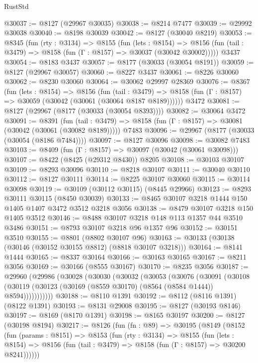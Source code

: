 \begin{lexlean}{RustStd}
\begin{coremodule}
@30037 := @8127 (@29967 @30035)
@30038 := @8214 @7477
@30039 := @29992 @30038
@30040 := @8198 @30039
@30042 := @8127 (@30040 @8219)
@30053 := @8345
    (fun (rty : @3134) =>
    @8155
      (fun (lets : @8154) =>
      @8156 (fun (tail : @3479) => @8158 (fun (Γ : @8157) => @30037 (@30042 @30002)))))
    @3437
@30054 := @8183 @3437
@30057 := @8177 (@30033 (@30054 @8191))
@30059 := @8127 (@29967 @30057)
@30060 := @8227 @3437
@30061 := @8226 @30060
@30062 := @8230 @30060
@30064 := @30062 @29997 @28369
@30076 := @8367
    (fun (lets : @8154) =>
    @8156
      (fun (tail : @3479) =>
      @8158 (fun (Γ : @8157) => @30059 (@30042 (@30061 (@30064 @8187 @8189))))))
    @3472
@30081 := @8127 (@29967 (@8177 (@30033 (@30054 @8393))))
@30082 := @30064 @3472
@30091 := @8391
    (fun (tail : @3479) => @8158 (fun (Γ : @8157) => @30081 (@30042 (@30061 (@30082 @8189)))))
    @7483
@30096 := @29967 (@8177 (@30033 (@30054 (@8186 @7484))))
@30097 := @8127 @30096
@30098 := @30082 @7483
@30103 := @8409 (fun (Γ : @8157) => @30097 (@30042 (@30061 @30098)))
@30107 := @8422 (@8425 (@29312 @8430)) @8205
@30108 := @30103 @30107
@30109 := @8293 @30096
@30110 := @8218 @30107
@30111 := @30040 @30110
@30112 := @8127 @30111
@30114 := @8225 @30107 @30060
@30115 := @30114 @30098
@30119 := @30109 (@30112 @30115) (@8445 @29966)
@30123 := @8293 @30111 @30115 (@8450 @30039)
@30133 := @8465 @30107 @3218 @1444 @150 @1405 @1407 @3472 @3512 @3218 @3056
@30138 := @8479 @30107 @3218 @150 @1405 @3512
@30146 := @8488 @30107 @3218 @148 @113 @1357 @44 @3510 @3486
@30151 := @8793 @30107 @3218 @96 @1357 @96
@30152 := @30151 @3510
@30155 := @8801 (@8802 @30107 @96)
@30163 := @30133 (@30138 (@30146 (@30152 @30155 @8812) (@8818 @30107 @3218)))
@30164 := @8141 @1444
@30165 := @8337 @30164
@30166 := @30163 @30165
@30167 := @8211 @3056
@30169 := @30166 (@8555 @30167)
@30170 := @8235 @3056
@30187 := @29960
    (@29986
      (@30028
        (@30030
          (@30032
            (@30053
              (@30076
                (@30091
                  (@30108
                    (@30119 (@30123 (@30169 (@8559 @30170) (@8564 (@8584 @1444)) @8594)))))))))))
@30188 := @8110 @1391
@30192 := @8112 (@8116 @1391) (@8122 @1391)
@30193 := @8131 @29008
@30195 := @8127 (@30193 @8146)
@30197 := @8169 (@8170 @1391)
@30198 := @8165 @30197
@30200 := @8127 (@30198 @8194)
@30217 := @8126
    (fun (fn : @89) =>
    @30195
      (@8149
        (@8152
          (fun (params : @8151) =>
          @8153
            (fun (rty : @3134) =>
            @8155
              (fun (lets : @8154) =>
              @8156 (fun (tail : @3479) => @8158 (fun (Γ : @8157) => @30200 @8241))))))

\end{coremodule}
\end{lexlean}
